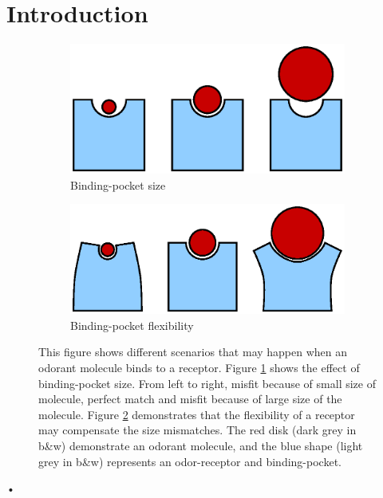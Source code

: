 \documentclass[11pt]{paper} %
\begin{document}
\section{Introduction}
\begin{figure}
	\centering
	\begin{subfigure}[b]{0.45 \textwidth}
		\includegraphics[width=\textwidth]{fig/binding-pocket}
		\caption{Binding-pocket size}
		\label{fig:pocket-size}
	\end{subfigure}
	\begin{subfigure}[b]{0.45 \textwidth}
		\includegraphics[width=\textwidth]{fig/binding-pocket-flex}
		\caption{Binding-pocket flexibility}
		\label{fig:pocket-flex}
	\end{subfigure}
	\caption{This figure shows different scenarios that may happen when an odorant molecule binds to a receptor. 
	Figure \ref{fig:pocket-size} shows the effect of binding-pocket size. 
	From left to right, misfit because of small size of molecule, perfect match and misfit because of large size of the molecule.
	Figure \ref{fig:pocket-flex} demonstrates that the flexibility of a receptor may compensate the size mismatches. 
	The red disk (dark grey in b\&w) demonstrate an odorant molecule, 
	and the blue shape (light grey in b\&w) represents an odor-receptor and binding-pocket.}
	\label{fig:binding-pocket}
\end{figure}•
\end{document}
